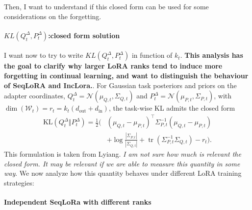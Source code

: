 \documentclass{article}
\theoremstyle{plain}
\theoremstyle{definition}
\theoremstyle{remark}
\begin{document}
Then, I want to understand if this closed form can be used for some considerations on the forgetting. 
\paragraph{$KL(Q_t^{\Delta}, P_t^{\Delta})$:closed form solution}
I want now to try to write $KL(Q_t^{\Delta}, P_t^{\Delta})$ in function of $k_t$. \textbf{This analysis has the goal to clarify why larger LoRA ranks tend to induce more forgetting in continual learning, and want to distinguish the behaviour of SeqLoRA and IncLora.}.
For Gaussian task posteriors and priors on the adapter coordinates,
$Q_t^\Delta=\mathcal N(\mu_{Q,t},\Sigma_{Q,t})$ and
$P_t^\Delta=\mathcal N(\mu_{P,t},\Sigma_{P,t})$,
with $\dim(\mathcal W_t)=r_t=k_t(d_{\text{out}}+d_{\text{in}})$,
the task-wise KL admits the closed form
\begin{equation}
    \begin{aligned}
\mathrm{KL}(Q_t^\Delta\Vert P_t^\Delta)
=
\frac12\Big(
&(\mu_{Q,t}-\mu_{P,t})^\top\Sigma_{P,t}^{-1}(\mu_{Q,t}-\mu_{P,t}) \\
&+ \log\frac{|\Sigma_{P,t}|}{|\Sigma_{Q,t}|}
+ \operatorname{tr}(\Sigma_{P,t}^{-1}\Sigma_{Q,t})
- r_t
\Big).
    \end{aligned}
\end{equation}
This formulation is taken from Lyiang. \textit{I am not sure how much is relevant the closed form. It may be relevant if we are able to measure this quantity in some way}. We now analyze how this quantity behaves under different LoRA training strategies:

\paragraph{Independent SeqLoRa with different ranks}
\end{document}

